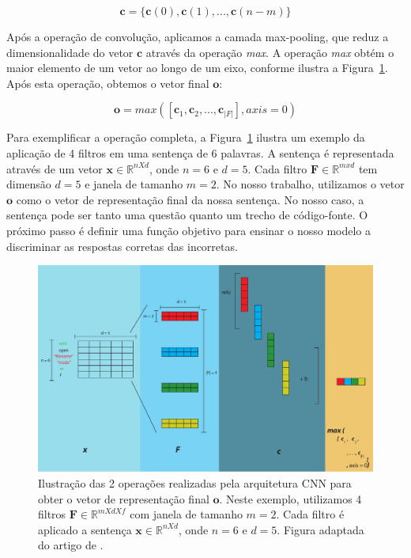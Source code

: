 \begin{equation}
\label{eq:feature-map}
    \bm{c} = \{ \bm{c}(0), \bm{c}(1), . . ., \bm{c}(n - m) \} 
\end{equation}




Após a operação de convolução, aplicamos a camada \gls{max-pooling}, que reduz a dimensionalidade do vetor $\bm{c}$ através da operação \textit{max}. A operação \textit{max} obtém o maior elemento de um vetor ao longo de um eixo, conforme ilustra a Figura~\ref{fig:cnn-architecture-proposal}. Após esta operação, obtemos o vetor final $\bm{o}$:

\begin{equation}
    \bm{o} = max\left(\left[\bm{c}_{1}, \bm{c}_{2}, . . ., \bm{c}_{|F|}\right], axis = 0\right)
\end{equation}

Para exemplificar a operação completa, a Figura~\ref{fig:cnn-architecture-proposal} ilustra um exemplo da aplicação de 4 filtros em uma sentença de 6 palavras. A sentença é representada através de um vetor $\bm{x} \in \mathbb{R}^{n X d}$, onde $n = 6$ e $d = 5$. Cada filtro $\bm{F} \in \mathbb{R}^{m x d}$ tem dimensão $d = 5$ e janela de tamanho $m = 2$. No nosso trabalho, utilizamos o vetor $\bm{o}$ como o vetor de representação final da nossa sentença. No nosso caso, a sentença pode ser tanto uma questão quanto um trecho de código-fonte. O próximo passo é definir uma função objetivo para ensinar o nosso modelo a discriminar as respostas corretas das incorretas.

\begin{figure}[h]
    \centering
    \includegraphics[width=1\textwidth]{figuras/cap-problema/cnn-steps-word-embedding-article.pdf}
    \caption{Ilustração das 2 operações realizadas pela arquitetura CNN para obter o vetor de representação final $\bm{o}$. Neste exemplo, utilizamos 4 filtros $\bm{F} \in \mathbb{R}^{m X d X f}$ com janela de tamanho $m = 2$. Cada filtro é aplicado a sentença $\bm{x} \in \mathbb{R}^{n X d}$, onde $n = 6$ e $d = 5$. Figura adaptada do artigo de \cite{zhang-guide-convolutional-cnn-embedding-ilustration:2015}.}
    \label{fig:cnn-architecture-proposal}
\end{figure}





